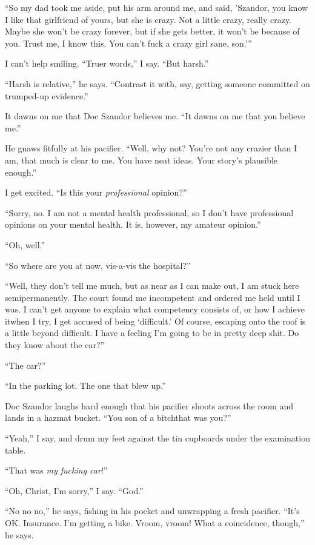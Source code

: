 “So my dad took me aside, put his arm around me, and said,
’Szandor, you know I like that girlfriend of yours, but she is
crazy. Not a little crazy, really crazy. Maybe she won’t be crazy
forever, but if she gets better, it won’t be because of you. Trust
me, I know this. You can’t fuck a crazy girl sane, son.’”

I can’t help smiling. “Truer words,” I say. “But harsh.”

“Harsh is relative,” he says. “Contrast it with, say, getting
someone committed on trumped-up evidence.”

It dawns on me that Doc Szandor believes me. “It dawns on me that
you believe me.”

He gnaws fitfully at his pacifier. “Well, why not? You’re not any
crazier than I am, that much is clear to me. You have neat ideas.
Your story’s plausible enough.”

I get excited. “Is this your \emph{professional} opinion?”

“Sorry, no. I am not a mental health professional, so I don’t have
professional opinions on your mental health. It is, however, my
amateur opinion.”

“Oh, well.”

“So where are you at now, vis-a-vis the hospital?”

“Well, they don’t tell me much, but as near as I can make out, I am
stuck here semipermanently. The court found me incompetent and
ordered me held until I was. I can’t get anyone to explain what
competency consists of, or how I achieve it{\dash}when I try, I get
accused of being ‘difficult.’ Of course, escaping onto the roof is
a little beyond difficult. I have a feeling I’m going to be in
pretty deep shit. Do they know about the car?”

“The car?”

“In the parking lot. The one that blew up.”

Doc Szandor laughs hard enough that his pacifier shoots across the
room and lands in a hazmat bucket. “You son of a bitch{\dash}that was
you?”

“Yeah,” I say, and drum my feet against the tin cupboards under the
examination table.

“That was \emph{my fucking car}!”

“Oh, Christ, I’m sorry,” I say. “God.”

“No no no,” he says, fishing in his pocket and unwrapping a fresh
pacifier. “It’s OK. Insurance. I’m getting a bike. Vroom, vroom!
What a coincidence, though,” he says.

